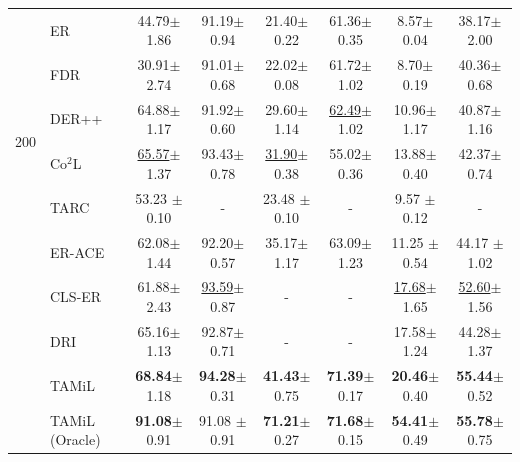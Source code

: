 \documentclass{article} %
\begin{document}
{\begin{threeparttable}[t]
\begin{tabular}{ll|cc|cc|cc}
\multirow{6}{*}{200}  
  & ER  & 44.79\scriptsize{$\pm$1.86} & 91.19\scriptsize{$\pm$0.94}  & 21.40\scriptsize{$\pm$0.22} & 61.36\scriptsize{$\pm$0.35} & 8.57\scriptsize{$\pm$0.04} & 38.17\scriptsize{$\pm$2.00} \\
   & FDR  & 30.91\scriptsize{$\pm$2.74} & 91.01\scriptsize{$\pm$0.68} & 22.02\scriptsize{$\pm$0.08} & 61.72\scriptsize{$\pm$1.02}& 8.70\scriptsize{$\pm$0.19} & 40.36\scriptsize{$\pm$0.68} \\
  & DER++  & 64.88\scriptsize{$\pm$1.17} & 91.92\scriptsize{$\pm$0.60}&  29.60\scriptsize{$\pm$1.14} & \underline{62.49}\scriptsize{$\pm$1.02}& 10.96\scriptsize{$\pm$1.17} & 40.87\scriptsize{$\pm$1.16} \\
    & Co$^{2}$L  &  \underline{65.57}\scriptsize{$\pm$1.37} & 93.43\scriptsize{$\pm$0.78} & \underline{31.90}\scriptsize{$\pm$0.38} & 55.02\scriptsize{$\pm$0.36} & 13.88\scriptsize{$\pm$0.40} & 42.37\scriptsize{$\pm$0.74} \\
    & TARC  &  53.23 \scriptsize{$\pm$0.10} & - & 23.48 \scriptsize{$\pm$0.10} & - & 9.57 \scriptsize{$\pm$0.12} & - \\
  & ER-ACE  & 62.08\scriptsize{$\pm$1.44} & 92.20\scriptsize{$\pm$0.57} & 35.17\scriptsize{$\pm$1.17} & 63.09\scriptsize{$\pm$1.23} &  11.25 \scriptsize{$\pm$ 0.54}  & 44.17 \scriptsize{$\pm$1.02} \\
  & CLS-ER\tnote{1}& 	61.88\scriptsize{$\pm$2.43}  & \underline{93.59}\scriptsize{$\pm$0.87} & - & - &  \underline{17.68}\scriptsize{$\pm$1.65} & \underline{52.60}\scriptsize{$\pm$1.56} \\
  & DRI  & 65.16\scriptsize{$\pm$1.13} & 92.87\scriptsize{$\pm$0.71} & - & - & 17.58\scriptsize{$\pm$1.24} & 44.28\scriptsize{$\pm$1.37} \\
  & TAMiL  & 	\textbf{68.84}\scriptsize{$\pm$1.18}  & \textbf{94.28}\scriptsize{$\pm$0.31} & 	\textbf{41.43}\scriptsize{$\pm$0.75}  & \textbf{71.39}\scriptsize{$\pm$0.17} & \textbf{20.46}\scriptsize{$\pm$0.40} & \textbf{55.44}\scriptsize{$\pm$0.52}  \\
  \midrule
  & TAMiL (Oracle)  & \textbf{91.08}\scriptsize{$\pm$0.91} & 91.08 \scriptsize{$\pm$0.91} & 	\textbf{71.21}\scriptsize{$\pm$0.27} & \textbf{71.68}\scriptsize{$\pm$0.15} & \textbf{54.41}\scriptsize{$\pm$0.49}  & \textbf{55.78}\scriptsize{$\pm$0.75} \\
\midrule


\end{tabular}
\end{threeparttable}}
\end{document}
